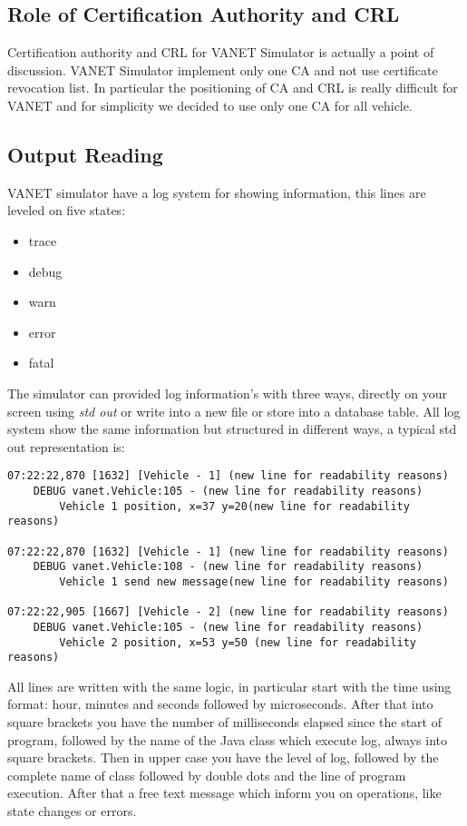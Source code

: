 \subsection{Role of Certification Authority and CRL}
Certification authority and CRL for VANET Simulator is actually a point of discussion\cite{calandriello}. VANET Simulator implement only one CA and not use certificate revocation list. In particular the positioning of CA and CRL is really difficult for VANET and for simplicity we decided to  use only one CA for all vehicle.
\subsection{Output Reading}
VANET simulator have a log system for showing information, this lines are leveled on five states:
\begin{itemize}
	\item trace
	\item debug
	\item warn
	\item error
	\item fatal
\end{itemize}
The simulator can provided log  information's with three ways, directly on your screen using \textit{std out} or write into a new file or store into a database table. All log system show the same information but structured in different ways, a typical std out representation is:
\begin{verbatim}
07:22:22,870 [1632] [Vehicle - 1] (new line for readability reasons)
	DEBUG vanet.Vehicle:105 - (new line for readability reasons)
		Vehicle 1 position, x=37 y=20(new line for readability reasons)
		
07:22:22,870 [1632] [Vehicle - 1] (new line for readability reasons)
	DEBUG vanet.Vehicle:108 - (new line for readability reasons)
		Vehicle 1 send new message(new line for readability reasons)
		
07:22:22,905 [1667] [Vehicle - 2] (new line for readability reasons)
	DEBUG vanet.Vehicle:105 - (new line for readability reasons)
		Vehicle 2 position, x=53 y=50 (new line for readability reasons)
\end{verbatim}
All lines are written with the same logic, in particular start with the time using format: hour, minutes and seconds followed by microseconds. After that into square brackets you have the number of milliseconds elapsed since the start of program, followed by the name of the Java class which execute log, always into square brackets. Then in upper case you have the level of log, followed by the complete name of class followed by double dots and the line of program execution. After that a free text message which inform you on operations, like state changes or errors.\\
